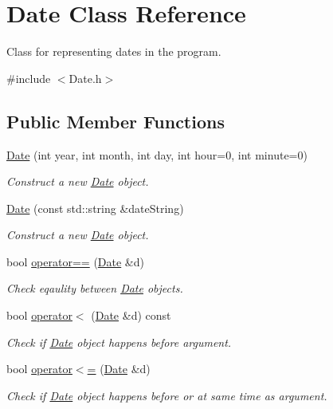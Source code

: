 \hypertarget{classDate}{}\section{Date Class Reference}
\label{classDate}


Class for representing dates in the program.  




{\ttfamily \#include $<$Date.\+h$>$}

\subsection*{Public Member Functions}
\begin{DoxyCompactItemize}
\item 
\mbox{\hyperlink{classDate_aa29ee0f04162437b91b758be0a4b75fc}{Date}} (int year, int month, int day, int hour=0, int minute=0)
\begin{DoxyCompactList}\small\item\em Construct a new \mbox{\hyperlink{classDate}{Date}} object. \end{DoxyCompactList}\item 
\mbox{\hyperlink{classDate_abaa8b0cf93eb1ad9206be4ff78ed2a3b}{Date}} (const std\+::string \&date\+String)
\begin{DoxyCompactList}\small\item\em Construct a new \mbox{\hyperlink{classDate}{Date}} object. \end{DoxyCompactList}\item 
bool \mbox{\hyperlink{classDate_a91ccc0361527f5f68785c5460d750a12}{operator==}} (\mbox{\hyperlink{classDate}{Date}} \&d)
\begin{DoxyCompactList}\small\item\em Check eqaulity between \mbox{\hyperlink{classDate}{Date}} objects. \end{DoxyCompactList}\item 
bool \mbox{\hyperlink{classDate_a6523cc8b3f5e669fe37a6976a27737d5}{operator$<$}} (\mbox{\hyperlink{classDate}{Date}} \&d) const
\begin{DoxyCompactList}\small\item\em Check if \mbox{\hyperlink{classDate}{Date}} object happens before argument. \end{DoxyCompactList}\item 
bool \mbox{\hyperlink{classDate_a49b4e0ed6752c928164fd483720423da}{operator$<$=}} (\mbox{\hyperlink{classDate}{Date}} \&d)
\begin{DoxyCompactList}\small\item\em Check if \mbox{\hyperlink{classDate}{Date}} object happens before or at same time as argument. \end{DoxyCompactList}\item 

\end{DoxyCompactItemize}
